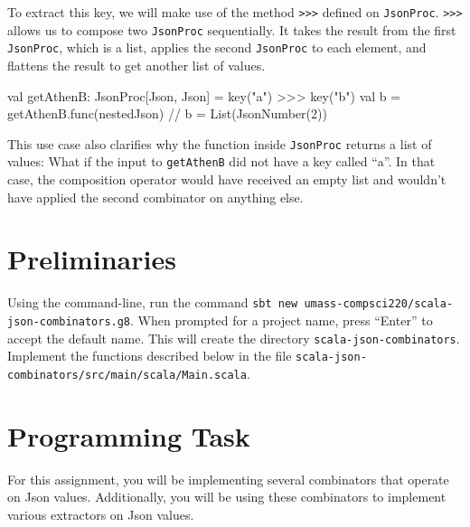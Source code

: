 To extract this key, we will make use of the method \texttt{>>>} defined on
\texttt{JsonProc}. \texttt{>>>} allows us to compose two \texttt{JsonProc}
sequentially. It takes the result from the first \texttt{JsonProc}, which is a
list, applies the second \texttt{JsonProc} to each element, and flattens the result
to get another list of values.
\begin{scalacode}
val getAthenB: JsonProc[Json, Json] = key("a") >>> key("b")
val b = getAthenB.func(nestedJson) // b = List(JsonNumber(2))
\end{scalacode}
This use case also clarifies why the function inside \texttt{JsonProc} returns
a list of values: What if the input to \texttt{getAthenB} did not have a key
called ``a''. In that case, the composition operator would have received an
empty list and wouldn't have applied the second combinator on anything else.

\section{Preliminaries}
Using the command-line, run the command
\verb|sbt new umass-compsci220/scala-json-combinators.g8|. When prompted for
a project name, press ``Enter'' to accept the default name. This will create
the directory \verb|scala-json-combinators|. Implement the functions described
below in the file \verb|scala-json-combinators/src/main/scala/Main.scala|.

\section{Programming Task}
For this assignment, you will be implementing several combinators that operate
on Json values. Additionally, you will be using these combinators to implement
various extractors on Json values.

